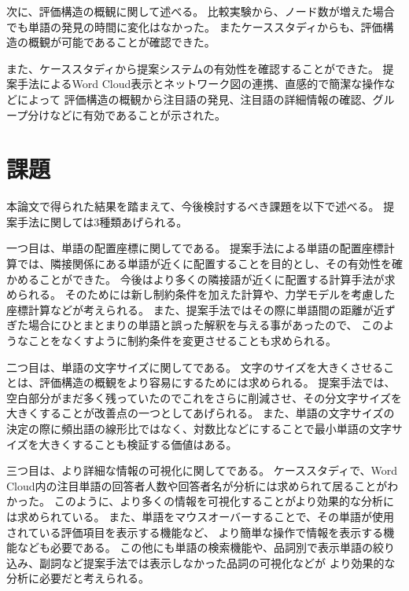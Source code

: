 \documentclass[syuuron]{kuee}
\begin{document}
		次に、評価構造の概観に関して述べる。
		比較実験から、ノード数が増えた場合でも単語の発見の時間に変化はなかった。
		またケーススタディからも、評価構造の概観が可能であることが確認できた。
		
		また、ケーススタディから提案システムの有効性を確認することができた。
		提案手法によるWord Cloud表示とネットワーク図の連携、直感的で簡潔な操作などによって
		評価構造の概観から注目語の発見、注目語の詳細情報の確認、グループ分けなどに有効であることが示された。		
		
	\section{課題}
		本論文で得られた結果を踏まえて、今後検討するべき課題を以下で述べる。
		提案手法に関しては3種類あげられる。
		
		一つ目は、単語の配置座標に関してである。
		提案手法による単語の配置座標計算では、隣接関係にある単語が近くに配置することを目的とし、その有効性を確かめることができた。
		今後はより多くの隣接語が近くに配置する計算手法が求められる。
		そのためには新し制約条件を加えた計算や、力学モデルを考慮した座標計算などが考えられる。
		また、提案手法ではその際に単語間の距離が近ずぎた場合にひとまとまりの単語と誤った解釈を与える事があったので、
		このようなことをなくすように制約条件を変更させることも求められる。
		
		二つ目は、単語の文字サイズに関してである。
		文字のサイズを大きくさせることは、評価構造の概観をより容易にするためには求められる。
		提案手法では、空白部分がまだ多く残っていたのでこれをさらに削減させ、その分文字サイズを大きくすることが改善点の一つとしてあげられる。
		また、単語の文字サイズの決定の際に頻出語の線形比ではなく、対数比などにすることで最小単語の文字サイズを大きくすることも検証する価値はある。
		
		三つ目は、より詳細な情報の可視化に関してである。
		ケーススタディで、Word Cloud内の注目単語の回答者人数や回答者名が分析には求められて居ることがわかった。
		このように、より多くの情報を可視化することがより効果的な分析には求められている。
		また、単語をマウスオーバーすることで、その単語が使用されている評価項目を表示する機能など、
		より簡単な操作で情報を表示する機能なども必要である。
		この他にも単語の検索機能や、品詞別で表示単語の絞り込み、副詞など提案手法では表示しなかった品詞の可視化などが
		より効果的な分析に必要だと考えられる。
		
\end{document}
